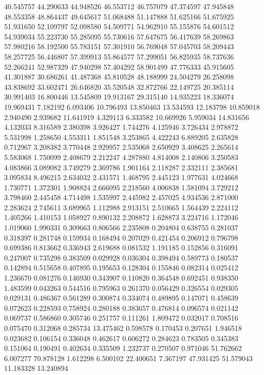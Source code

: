 40.545757
44.290633
44.948526
46.553712
46.757079
47.374597
47.945848
48.553358
48.864437
49.645617
51.068488
51.147888
51.625166
51.675925
51.931650
52.109797
52.098580
54.509771
54.962910
55.155876
54.601512
54.939034
55.223730
55.285095
55.730616
57.647675
56.417639
58.269863
57.980216
58.192500
55.783151
57.301910
56.769048
57.045703
58.209443
58.257725
56.446807
57.399913
55.864577
57.299051
56.825935
58.737636
52.266241
52.987329
47.940298
57.404292
58.901499
47.776333
45.915605
41.301887
30.686261
41.487368
45.810528
48.188999
24.504279
26.258098
43.838692
33.602471
26.646820
35.520548
32.872766
22.149725
20.385114
30.991403
16.800446
13.545809
19.913167
29.315140
14.935223
18.336074
19.969431
7.182192
6.093406
10.796493
13.850463
13.534593
12.183798
10.859018
2.940490
2.939682
11.641919
4.329113
6.333582
10.669926
5.959034
14.831656
4.132033
8.316589
2.380398
3.926427
1.744276
4.125946
3.726434
2.978872
5.531998
1.258650
4.553311
1.851548
3.253865
4.422243
6.889205
2.635828
0.712967
3.208382
3.770448
2.929957
2.535068
2.650929
3.408625
2.265614
5.583068
1.750099
2.408679
2.212247
4.287880
4.814008
2.140806
3.250583
4.083866
3.089082
3.749279
2.369786
1.901164
2.118287
2.332111
2.385681
3.095834
8.496215
2.634032
2.431571
1.468795
2.445123
1.977631
4.024668
1.730771
1.372301
1.908824
2.666095
2.218560
4.006838
1.581094
3.729212
3.798460
2.445458
4.714498
1.535997
2.445982
2.457025
4.934536
2.871000
2.283624
2.745611
3.689965
1.112988
2.913151
2.510665
1.564439
2.224112
1.405266
1.410153
1.058927
0.890132
2.208872
1.628873
3.224716
1.172046
1.019060
1.990331
0.309663
0.806566
2.235808
0.204804
0.638755
0.281037
0.318397
0.281748
0.159934
0.168494
0.207029
0.421454
0.206912
0.796798
0.699386
0.813662
0.336943
2.619688
0.081532
1.191185
0.152856
0.316091
0.247007
0.735298
0.383509
0.029928
0.036304
0.398494
0.589773
0.180537
0.142894
0.515658
0.407895
0.195653
0.128304
0.155846
0.082314
0.025412
1.236670
0.081276
0.146930
0.343907
0.110820
0.364548
0.692451
0.938350
1.483599
0.043263
0.544516
0.795963
0.261370
0.056429
0.326554
0.029305
0.029131
0.486367
0.561289
0.300874
0.334074
0.489895
0.147071
0.458639
0.072623
0.228593
0.758924
0.280188
0.383657
0.476814
0.096574
0.021142
0.069737
0.586860
0.305746
0.251757
0.111261
1.809472
0.032017
0.708516
0.075470
0.312068
0.285734
13.475462
0.598578
0.170453
0.207651
1.946518
0.023682
0.106154
0.336048
0.462617
0.606272
0.284623
0.783505
0.345383
0.151064
0.190491
0.402634
0.335509
1.232737
0.270507
0.971046
51.762662
6.007277
70.878128
1.612298
6.500102
22.400651
7.367197
47.931425
51.579043
11.183328
13.240894
